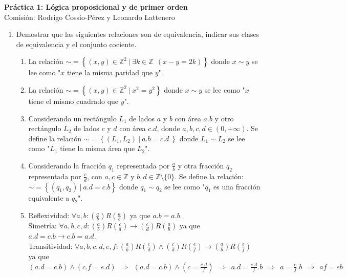 \documentclass[a4paper]{article}
\newcommand{\answer}{\item[**]}
\newcommand{\exercise}{\item}
\newcommand{\Then}{\Rightarrow}
\begin{document}
\noindent \hrulefill 
\vspace{-7pt}
\begin{center} 
	\textbf{ Práctica 1: Lógica proposicional y de primer orden } \\
	Comisión: Rodrigo Cossio-Pérez y Leonardo Lattenero
\end{center}
\vspace{-10pt}
\hrulefill


\begin{enumerate}

	\exercise Demostrar que las siguientes relaciones son de equivalencia, indicar sus clases de equivalencia y el conjunto cociente.
	\begin{enumerate} [label=(\alph*)]
		\item La relación $ \sim = \left\lbrace (x,y) \in \mathbb{Z}^{2} ~|~ \exists k \in \mathbb{Z} ~~(x-y=2k) \right\rbrace$ donde $x \sim y$ se lee como "$x$ tiene la misma paridad que $y$".
		
		\item La relación $ \sim = \left\lbrace (x,y)\in \mathbb{Z}^{2} ~|~ x^{2}=y^{2} \right\rbrace$ donde $x \sim y$ se lee como "$x$ tiene el mismo cuadrado que $y$".
		
		\item Considerando un rectángulo $L_{1}$ de lados $a$ y $b$ con área $a.b$ y otro rectángulo $L_2$ de lados $c$ y $d$ con área $c.d$, donde $a,b,c,d \in ( 0 , +\infty)$. Se define la relación $ \sim = \left\lbrace (L_1,L_2) ~|~ a.b=c.d ~\right\rbrace$ donde $L_{1}\sim L_{2}$ se lee como "$L_{1}$ tiene la misma área que $L_{2}$".
		
		\item Considerando la fracción $q_1$ representada por $\displaystyle\frac{a}{b}$ y otra fracción $q_2$ representada por $\displaystyle\frac{c}{d}$, con $a,c\in\mathbb{Z}$ y $b,d\in\mathbb{Z}\setminus\{0\} $. Se define la relación: $\sim = \left\lbrace (q_1,q_2) ~|~ a.d=c.b \right\rbrace$ donde $q_{1}\sim q_{2}$ se lee como "$q_{1}$ es una fracción equivalente a $q_{2}$".
		\answer Reflexividad: $\forall a,b:  \left(\frac{a}{b}\right) R \left(\frac{a}{b}\right)$ ya que $a.b=a.b$. \\ Simetría: $\forall a,b,c,d: \left(\frac{a}{b}\right) R \left(\frac{c}{d}\right) \to \left(\frac{c}{d}\right) R \left(\frac{a}{b}\right)$ ya que $a.d=c.b \to c.b=a.d$. \\ Transitividad: $\forall a,b,c,d,e,f:  \left(\frac{a}{b}\right) R \left(\frac{c}{d}\right) \land \left(\frac{c}{d}\right) R \left(\frac{e}{f}\right) \to \left(\frac{a}{b}\right) R \left(\frac{e}{f}\right)$ \\ ya que $(a.d=c.b) \land (c.f=e.d) ~~\Then~~ (a.d=c.b) \land (c=\frac{e.d}{f}) ~~\Then~~ a.d=\frac{e.d}{f}.b ~~\Then~~ a=\frac{e}{f}.b ~~\Then~~ af=eb$


\end{enumerate}
\end{enumerate}
\end{document}
